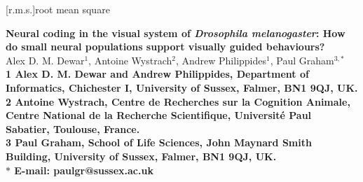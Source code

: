 \pagestyle{myheadings}



\usepackage{verbatim} %

\usepackage[utf8]{inputenc}

\usepackage{gensymb} %

\usepackage{acronym}
[r.m.s.]{root mean square}

\newcommand{\Matlab}{MATLAB}



\begin{flushleft}
{\Large
\textbf{Neural coding in the visual system of \emph{Drosophila melanogaster}: How do small neural populations support visually guided behaviours?}
}
\\
Alex D. M. Dewar$^{1}$,
Antoine Wystrach$^{2}$,
Andrew Philippides$^{1}$,
Paul Graham$^{3,\ast}$
\\
\bf{1} Alex D. M. Dewar and Andrew Philippides, Department of Informatics, Chichester I, University of Sussex, Falmer, BN1 9QJ, UK.
\\
\bf{2} Antoine Wystrach, Centre de Recherches sur la Cognition Animale, Centre National de la Recherche Scientifique, Université Paul Sabatier, Toulouse, France.
\\
\bf{3} Paul Graham, School of Life Sciences, John Maynard Smith Building, University of Sussex, Falmer, BN1 9QJ, UK.
\\
$\ast$ E-mail: paulgr@sussex.ac.uk
\end{flushleft}

